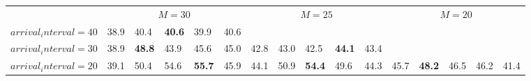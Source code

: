 \begin{tabular}{l  | l l l l l  | l l l l l  | l l l l l }
& \multicolumn{5}{c}{$M=30$} & \multicolumn{5}{c}{$M=25$} & \multicolumn{5}{c}{$M=20$} \\
$arrival_interval=40$ & 38.9 & 40.4 & \textbf{40.6} & 39.9 & 40.6 &  &  &  &  &  &  &  &  &  &  \\
$arrival_interval=30$ & 38.9 & \textbf{48.8} & 43.9 & 45.6 & 45.0 & 42.8 & 43.0 & 42.5 & \textbf{44.1} & 43.4 &  &  &  &  &  \\
$arrival_interval=20$ & 39.1 & 50.4 & 54.6 & \textbf{55.7} & 45.9 & 44.1 & 50.9 & \textbf{54.4} & 49.6 & 44.3 & 45.7 & \textbf{48.2} & 46.5 & 46.2 & 41.4
\end{tabular}